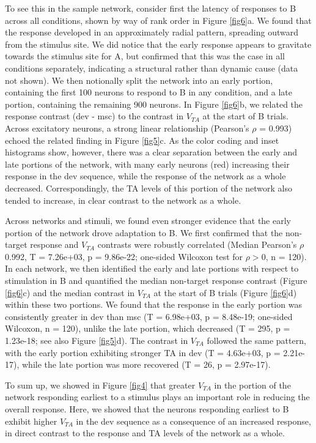 \documentclass[pdflatex,referee,iicol,sn-basic]{sn-jnl}
\theoremstyle{thmstyleone}%
\theoremstyle{thmstyletwo}%
\theoremstyle{thmstylethree}%
\begin{document}
To see this in the sample network, consider first the latency of responses to B across all conditions, shown by way of rank order in Figure \ref{fig6}a. We found that the response developed in an approximately radial pattern, spreading outward from the stimulus site. We did notice that the early response appears to gravitate towards the stimulus site for A, but confirmed that this was the case in all conditions separately, indicating a structural rather than dynamic cause (data not shown). We then notionally split the network into an early portion, containing the first 100 neurons to respond to B in any condition, and a late portion, containing the remaining 900 neurons. In Figure \ref{fig6}b, we related the response contrast (dev - msc) to the contrast in $V_{TA}$ at the start of B trials. Across excitatory neurons, a strong linear relationship (Pearson's $\rho$ = 0.993) echoed the related finding in Figure \ref{fig5}c. As the color coding and inset histograms show, however, there was a clear separation between the early and late portions of the network, with many early neurons (red) increasing their response in the dev sequence, while the response of the network as a whole decreased. Correspondingly, the TA levels of this portion of the network also tended to increase, in clear contrast to the network as a whole.

Across networks and stimuli, we found even stronger evidence that the early portion of the network drove adaptation to B. We first confirmed that the non-target response and $V_{TA}$ contrasts were robustly correlated (Median Pearson's $\rho$ 0.992, T = 7.26e+03, p = 9.86e-22; one-sided Wilcoxon test for $\rho > 0$, n = 120). In each network, we then identified the early and late portions with respect to stimulation in B and quantified the median non-target response contrast (Figure \ref{fig6}c) and the median contrast in $V_{TA}$ at the start of B trials (Figure \ref{fig6}d) within these two portions. We found that the response in the early portion was consistently greater in dev than msc (T = 6.98e+03, p = 8.48e-19; one-sided Wilcoxon, n = 120), unlike the late portion, which decreased (T = 295, p = 1.23e-18; see also Figure \ref{fig5}d). The contrast in $V_{TA}$ followed the same pattern, with the early portion exhibiting stronger TA in dev (T = 4.63e+03, p = 2.21e-17), while the late portion was more recovered (T = 26, p = 2.97e-17).

To sum up, we showed in Figure \ref{fig4} that greater $V_{TA}$ in the portion of the network responding earliest to a stimulus plays an important role in reducing the overall response. Here, we showed that the neurons responding earliest to B exhibit higher $V_{TA}$ in the dev sequence as a consequence of an increased response, in direct contrast to the response and TA levels of the network as a whole.
\end{document}
